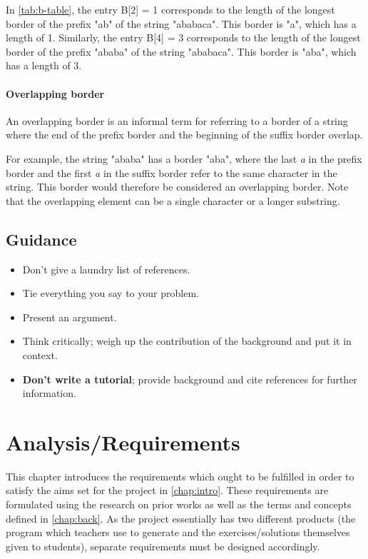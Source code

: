 \documentclass{l4proj}
\begin{document}
In \autoref{tab:b-table}, the entry B[2] = 1 corresponds to the length of the longest border of the prefix "ab" of the string "ababaca". This border is "a", which has a length of 1. Similarly, the entry B[4] = 3 corresponds to the length of the longest border of the prefix "ababa" of the string "ababaca". This border is "aba", which has a length of 3.

\subsubsection{Overlapping border}
An overlapping border is an informal term for referring to a border of a string where the end of the prefix border and the beginning of the suffix border overlap.

For example, the string "ababa" has a border "aba", where the last \emph{a} in the prefix border and the first \emph{a} in the suffix border refer to the same character in the string. This border would therefore be considered an overlapping border. Note that the overlapping element can be a single character or a longer substring.

\section{Guidance}
\begin{itemize}    
    \item
      Don't give a laundry list of references.
    \item
      Tie everything you say to your problem.
    \item
      Present an argument.
    \item Think critically; weigh up the contribution of the background and put it in context.    
    \item
      \textbf{Don't write a tutorial}; provide background and cite
      references for further information.
\end{itemize}

\chapter{Analysis/Requirements}
\label{chap:req}

This chapter introduces the requirements which ought to be fulfilled in order to satisfy the aims set for the project in \autoref{chap:intro}. These requirements are formulated using the research on prior works as well as the terms and concepts defined in \autoref{chap:back}. As the project essentially has two different products (the program which teachers use to generate and the exercises/solutions themselves given to students), separate requirements must be designed accordingly.
\end{document}
